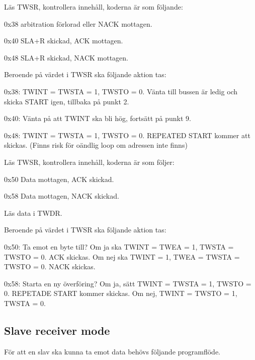 \begin{packed_enumerate}
\setcounter{enumi}{4}
\item Läs TWSR, kontrollera innehåll, koderna är som följande:
\begin{packed_enumerate}
\item 0x38 arbitration förlorad eller NACK mottagen.
\item 0x40 SLA+R skickad, ACK mottagen.
\item 0x48 SLA+R skickad, NACK mottagen.
\end{packed_enumerate}
\item Beroende på värdet i TWSR ska följande aktion tas:
\begin{packed_enumerate}
\item 0x38: TWINT = TWSTA = 1, TWSTO = 0. Vänta till bussen är ledig och skicka START igen, tillbaka på punkt 2.
\item 0x40: Vänta på att TWINT ska bli hög, fortsätt på punkt 9.
\item 0x48: TWINT = TWSTA = 1, TWSTO = 0. REPEATED START kommer att skickas. (Finns risk för oändlig loop om adressen inte finns)
\end{packed_enumerate}
\item Läs TWSR, kontrollera innehåll, koderna är som följer:
\begin{packed_enumerate}
\item 0x50 Data mottagen, ACK skickad.
\item 0x58 Data mottagen, NACK skickad.
\end{packed_enumerate}
\item Läs data i TWDR.
\item Beroende på värdet i TWSR ska följande aktion tas:
\begin{packed_enumerate}
\item 0x50: Ta emot en byte till? Om ja ska TWINT = TWEA = 1, TWSTA = TWSTO = 0. ACK skickas. Om nej ska TWINT = 1, TWEA = TWSTA = TWSTO = 0. NACK skickas.
\item 0x58: Starta en ny överföring? Om ja, sätt TWINT = TWSTA = 1, TWSTO = 0. REPETADE START kommer skickas. Om nej, TWINT = TWSTO = 1, TWSTA = 0.
\end{packed_enumerate}
\end{packed_enumerate}

\subsection{Slave receiver mode}
För att en slav ska kunna ta emot data behövs följande programflöde.

